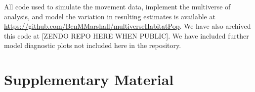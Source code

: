 \documentclass[10pt,a4paper]{article}
\begin{document}
All code used to simulate the movement data, implement the multiverse of analysis, and model the variation in resulting estimates is available at \url{https://github.com/BenMMarshall/multiverseHabitatPop}.
We have also archived this code at {[}ZENDO REPO HERE WHEN PUBLIC{]}.
We have included further model diagnostic plots not included here in the repository.

\clearpage

\section{Supplementary Material}\label{supplementary-material}

\clearpage

\begin{table}
\centering
\caption{\label{tab:directTable}An overall summary of all analyses and associated decisions in relation to the frequency of significant results.}
\centering
{}
\end{table}
\end{document}
